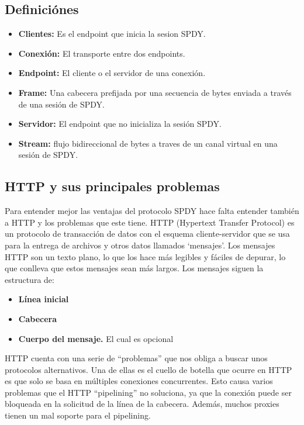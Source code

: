 \subsection{Definiciónes}
\begin{itemize}
\item \textbf{Clientes:} Es el endpoint que inicia la sesion SPDY.
\item \textbf{Conexión:} El transporte entre dos endpoints.
\item \textbf{Endpoint:} El cliente o el servidor de una conexión.
\item \textbf{Frame:} Una cabecera prefijada por una secuencia de bytes enviada a través de una sesión de SPDY.
\item \textbf{Servidor:} El endpoint que no inicializa la sesión SPDY.
\item \textbf{Stream:} flujo bidireccional de bytes a traves de un canal virtual en una sesión de SPDY.
\end{itemize}

\subsection{HTTP y sus principales problemas}
Para entender mejor las ventajas del protocolo SPDY hace falta entender también a HTTP y los problemas que este tiene.
HTTP (Hypertext Transfer Protocol) es un protocolo de transacción de datos con el esquema cliente-servidor que se usa para la entrega de archivos y otros datos llamados ‘mensajes’.
Los mensajes HTTP son un texto plano, lo que los hace más legibles y fáciles de depurar, lo que conlleva que estos mensajes sean más largos. Los mensajes siguen la estructura de:
\begin{itemize}
\item \textbf{Línea inicial}

\item \textbf{Cabecera} 

\item \textbf{Cuerpo del mensaje.} El cual es opcional
\end{itemize}
HTTP cuenta con una serie de “problemas” que nos obliga a buscar unos protocolos alternativos. Una de ellas es el cuello de botella que ocurre en HTTP es que solo se basa en múltiples conexiones concurrentes. Esto causa varios problemas que el HTTP “pipelining” no soluciona, ya que la conexión puede ser bloqueada en la solicitud de la línea de la cabecera.
Además, muchos proxies tienen un mal soporte para el pipelining.

